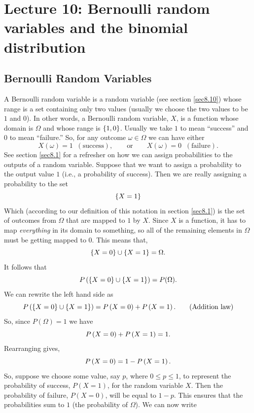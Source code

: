 \chapter{Lecture 10: Bernoulli random variables and the binomial distribution} \label{lect10}
\section{Bernoulli Random Variables} \label{bernoulli random variable}
A Bernoulli random variable is a random variable (see section \ref{sec8.10}) whose range is a set containing only two values (usually we choose the two values to be $1$ and $0$). In other words, a Bernoulli random variable, $X$, is a function whose domain is $\Omega$ and whose range is $\left\{1,0\right\}$. Usually we take $1$ to mean ``success'' and $0$ to mean ``failure.'' So, for any outcome $\omega \in \Omega$ we can have either
\[
X(\omega) = 1 \;\;(\text{success}), \qquad \text{or} \qquad X(\omega) = 0\;\; (\text{failure}).
\]
See section \ref{sec8.1} for a refresher on how we can assign probabilities to the outputs of a random variable. Suppose that we want to assign a probability to the output value $1$ (i.e., a probability of success). Then we are really assigning a probability to the set
\[
\left\{X = 1\right\}
\]
Which (according to our definition of this notation in section \ref{sec8.1}) is the set of outcomes from $\Omega$ that are mapped to $1$ by $X$. Since $X$ is a function, it has to map \textit{everything} in its domain to something, so all of the remaining elements in $\Omega$ must be getting mapped to $0$. This means that,
\[
\left\{X = 0\right\} \cup \left\{X = 1\right\} = \Omega.
\]
It follows that
\[
P\left(\left\{X = 0\right\} \cup \left\{X = 1\right\}\right) = P(\Omega).
\]
We can rewrite the left hand side as
\[
P\left(\left\{X = 0\right\} \cup \left\{X = 1\right\}\right) = P\left(X = 0\right) + P\left(X = 1\right). \tag{Addition law}
\]
So, since $P(\Omega) = 1$ we have
\[
P\left(X = 0\right) + P\left(X = 1\right) = 1.
\]
Rearranging gives,
\[
P\left(X = 0\right) = 1 - P\left(X = 1\right).
\]
So, suppose we choose some value, say $p$, where $0 \leq p \leq 1$, to represent the probability of success, $P(X=1)$, for the random variable $X$. Then the probability of failure, $P(X=0)$, will be equal to $1-p$. This ensures that the probabilities sum to $1$ (the probability of $\Omega$). We can now write

  	\bigskip
	
	\hfil{}
	\bigskip
	\bigskip

